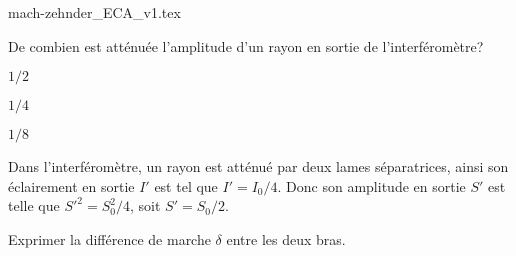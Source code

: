 \initialisationPartieDroite %
\begin{center}
	{mach-zehnder_ECA_v1.tex}
\end{center}
\finalisationDuPartageDePage %


\debutEntrainement


\begin{enonce}
	De combien est atténuée l'amplitude d'un rayon en sortie de l'interféromètre?
	\begin{listeQCM3Colonnes}
		\item $1/2$
		\item $1/4$
		\item $1/8$
		\end{listeQCM3Colonnes}
\end{enonce}
	
	\reponse{\reponseB{}}
	
	\begin{corrige}
		Dans l'interféromètre, un rayon est atténué par deux lames séparatrices, ainsi son éclairement en sortie $I'$ est tel que $I' = I_0/4$. Donc son amplitude en sortie $S'$ est telle que $S'^2 = S^2_0/4$, soit $S' = S_0/2$.
	\end{corrige}
	


\begin{enonce}
Exprimer la différence de marche $\delta$ entre les deux bras. 
\end{enonce}


